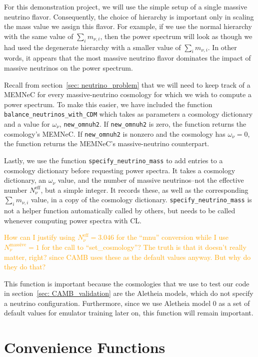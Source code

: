 For this demonstration project, we will use the simple setup of a single
massive neutrino flavor. Consequently, the choice of hierarchy is important
only in scaling the mass value we assign this flavor. For example, if we use
the normal hierarchy with the same value of $\sum_i m_{\nu, i}$, then the
power spectrum will look as though we had used the degenerate hierarchy with
a smaller value of $\sum_i m_{\nu, i}$. In other words, it appears that the
most massive neutrino flavor dominates the impact of massive neutrinos on the
power spectrum.

Recall from section~\ref{sec: neutrino_problem} that we will need to keep
track of a MEMNeC for every massive-neutrino cosmology for which we wish to
compute a power spectrum. To make this easier, we have included the function
\verb|balance_neutrinos_with_CDM| which takes as parameters a cosmology
dictionary and a value for $\omega_\nu$, \verb|new_omnuh2|. If
\verb|new_omnuh2| is zero, the function returns the cosmology's MEMNeC.
If \verb|new_omnuh2| is nonzero and the cosmology has $\omega_\nu = 0$, 
the function returns the MEMNeC's massive-neutrino counterpart.

Lastly, we use the function \verb|specify_neutrino_mass| to add entries to
a cosmology dictionary before requesting power spectra.
It takes a cosmology dictionary, an $\omega_\nu$ value, and the number of
massive neutrinos--not the effective number $N_\nu^\text{eff}$, but a simple 
integer. It records these, as well as the corresponding
$\sum_i m_{\nu, i}$ value, in a copy of the cosmology
dictionary. \verb|specify_neutrino_mass| is not a helper function 
automatically called by others, but needs to be called whenever computing
power spectra with CL.

\textcolor{orange}{How can I justify using $N_\nu^\text{eff} = 3.046$ for the
``mnu'' conversion while I use $N_\nu^\text{massive} = 1$ for the call to
``set\_cosmology''? The truth is that it doesn't really matter, right? since
CAMB uses these as the default values anyway. But why do they do that?}

This function is important because the cosmologies that we use to test our
code in section~\ref{sec: CAMB_validation} are the Aletheia models,
which do not specify a neutrino configuration. Furthermore, since we use 
Aletheia model 0 as a set of default values for emulator training later on,
this function will remain important.

\section{Convenience Functions}

